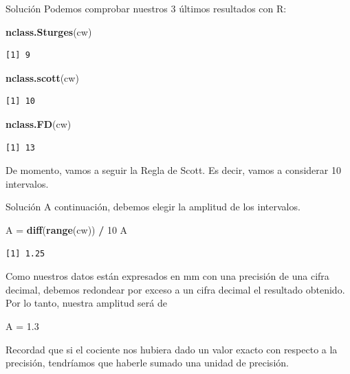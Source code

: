\documentclass[
  ignorenonframetext,
]{beamer}
\newenvironment{Shaded}{\begin{snugshade}}{\end{snugshade}}
\newcommand{\DecValTok}[1]{\textcolor[rgb]{0.00,0.00,0.81}{#1}}
\newcommand{\FloatTok}[1]{\textcolor[rgb]{0.00,0.00,0.81}{#1}}
\newcommand{\FunctionTok}[1]{\textcolor[rgb]{0.13,0.29,0.53}{\textbf{#1}}}
\newcommand{\NormalTok}[1]{#1}
\newcommand{\OtherTok}[1]{\textcolor[rgb]{0.56,0.35,0.01}{#1}}
\newcommand{\SpecialCharTok}[1]{\textcolor[rgb]{0.81,0.36,0.00}{\textbf{#1}}}
\begin{document}
\begin{frame}[fragile]{Solución}
\label{soluciuxf3n-3}
Podemos comprobar nuestros 3 últimos resultados con R:

\begin{Shaded}
\begin{Highlighting}[]
\FunctionTok{nclass.Sturges}\NormalTok{(cw)}
\end{Highlighting}
\end{Shaded}

\begin{verbatim}
[1] 9
\end{verbatim}

\begin{Shaded}
\begin{Highlighting}[]
\FunctionTok{nclass.scott}\NormalTok{(cw)}
\end{Highlighting}
\end{Shaded}

\begin{verbatim}
[1] 10
\end{verbatim}

\begin{Shaded}
\begin{Highlighting}[]
\FunctionTok{nclass.FD}\NormalTok{(cw)}
\end{Highlighting}
\end{Shaded}

\begin{verbatim}
[1] 13
\end{verbatim}

De momento, vamos a seguir la Regla de Scott. Es decir, vamos a
considerar 10 intervalos.
\end{frame}

\begin{frame}[fragile]{Solución}
\label{soluciuxf3n-4}
A continuación, debemos elegir la amplitud de los intervalos.

\begin{Shaded}
\begin{Highlighting}[]
\NormalTok{A }\OtherTok{=} \FunctionTok{diff}\NormalTok{(}\FunctionTok{range}\NormalTok{(cw)) }\SpecialCharTok{/} \DecValTok{10}
\NormalTok{A}
\end{Highlighting}
\end{Shaded}

\begin{verbatim}
[1] 1.25
\end{verbatim}

Como nuestros datos están expresados en mm con una precisión de una
cifra decimal, debemos redondear por exceso a un cifra decimal el
resultado obtenido. Por lo tanto, nuestra amplitud será de

\begin{Shaded}
\begin{Highlighting}[]
\NormalTok{A }\OtherTok{=} \FloatTok{1.3}
\end{Highlighting}
\end{Shaded}

Recordad que si el cociente nos hubiera dado un valor exacto con
respecto a la precisión, tendríamos que haberle sumado una unidad de
precisión.
\end{frame}
\end{document}
